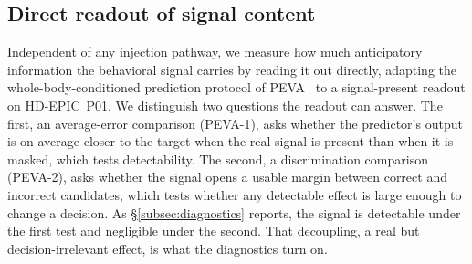 \subsection{Direct readout of signal content}
\label{subsec:method-peva}

Independent of any injection pathway, we measure how much anticipatory
information the behavioral signal carries by reading it out directly, adapting
the whole-body-conditioned prediction protocol of
PEVA~\citep{bai2025peva} to a signal-present readout on HD-EPIC~P01. We
distinguish two questions the readout can answer. The first, an average-error
comparison (PEVA-1), asks whether the predictor's output is on average closer to
the target when the real signal is present than when it is masked, which tests
detectability. The second, a discrimination comparison (PEVA-2), asks whether the
signal opens a usable margin between correct and incorrect candidates, which tests
whether any detectable effect is large enough to change a decision. As
\S\ref{subsec:diagnostics} reports, the signal is detectable under the first test
and negligible under the second. That decoupling, a real but decision-irrelevant
effect, is what the diagnostics turn on.